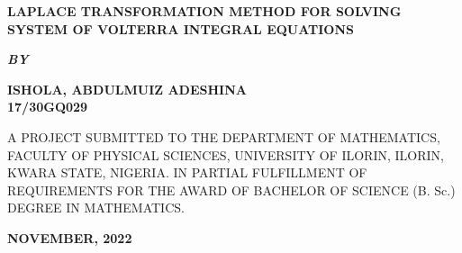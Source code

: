 \documentclass[11pt]{report}
\newcommand{\bt}[1]{\textbf{#1}}
\begin{document}
	
	\clearpage
	\thispagestyle{empty}
	\begin{center}
		\Large \bt{LAPLACE TRANSFORMATION METHOD FOR SOLVING SYSTEM OF VOLTERRA INTEGRAL EQUATIONS}
	\end{center}

	\hspace{7cm}
	
	\begin{center}
		\textbf{\textit{BY}}
	\end{center}
	
	\hspace{5cm}
	
	\begin{center}
		\large \textbf{ISHOLA, ABDULMUIZ ADESHINA
			\\
			17/30GQ029}
	\end{center}
	
	\hspace{9cm}
	
	\begin{center}
		A PROJECT SUBMITTED TO THE DEPARTMENT OF MATHEMATICS, FACULTY OF PHYSICAL SCIENCES, UNIVERSITY OF ILORIN, ILORIN, KWARA STATE, NIGERIA. IN PARTIAL FULFILLMENT OF REQUIREMENTS FOR THE AWARD OF BACHELOR OF SCIENCE (B. Sc.) DEGREE IN MATHEMATICS.
	\end{center}

	\hspace{7cm}
	
	\begin{center}
		\textbf{NOVEMBER, 2022}
	\end{center}

	\newpage
\end{document}
